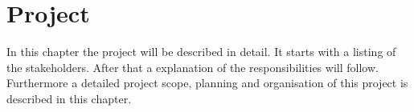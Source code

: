 \chapter{Project}
In this chapter the project will be described in detail. It starts with a listing of the
stakeholders. After that a explanation of the responsibilities will follow. Furthermore 
a detailed project scope, planning and organisation of this project is described in this chapter.




